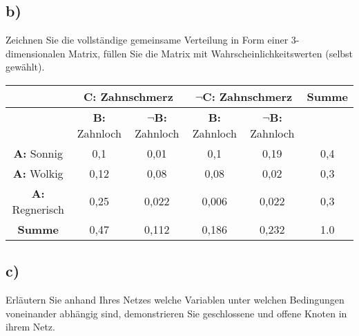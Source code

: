 \documentclass[12pt, a4paper]{article}
\begin{document}
\subsection*{b)}
Zeichnen Sie die vollständige gemeinsame Verteilung in Form einer 3-dimensionalen Matrix, füllen Sie die Matrix mit Wahrscheinlichkeitswerten (selbst gewählt).
\\
\hspace{-0.5cm}
\begin{flushleft}
\begin{tabular}[bct]{|c|c|c|c|c|c|}
\hline \bigstrut
& \multicolumn{2}{|c|}{\textbf{C:} Zahnschmerz } & \multicolumn{2}{|c|}{\textbf{$\neg$C}: Zahnschmerz } & \textbf{Summe} \\
\hline \bigstrut
& \textbf{B:} Zahnloch & \textbf{$\neg$B:} Zahnloch & \textbf{B:} Zahnloch & \textbf{$\neg$B:} Zahnloch & \\
\hline \bigstrut
\textbf{A:} Sonnig & 0,1 & 0,01 & 0,1 & 0,19 & 0,4 \\ 
\hline \bigstrut
\textbf{A:} Wolkig & 0,12 & 0,08 & 0,08 & 0,02 & 0,3 \\ 
\hline \bigstrut
\textbf{A:} Regnerisch & 0,25 & 0,022 & 0,006 & 0,022 & 0,3 \\ 
\hline \bigstrut
\textbf{Summe} & 0,47 & 0,112 & 0,186 & 0,232 & 1.0 \\ 
\hline
\end{tabular}
\end{flushleft}


\subsection*{c)}
Erläutern Sie anhand Ihres Netzes welche Variablen unter welchen Bedingungen voneinander abhängig sind, demonstrieren Sie geschlossene und offene Knoten in ihrem Netz.
\\
\end{document}
